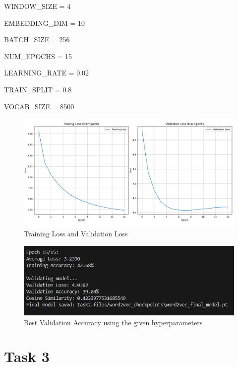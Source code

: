 \documentclass{article}
\begin{document}
\begin{description}
    \item WINDOW\_SIZE = 4
    \item EMBEDDING\_DIM = 10
    \item BATCH\_SIZE = 256
    \item NUM\_EPOCHS = 15
    \item LEARNING\_RATE = 0.02
    \item TRAIN\_SPLIT = 0.8
    \item VOCAB\_SIZE = 8500
\end{description}
\begin{figure}[H]
    \centering
    \includegraphics[width=1\linewidth]{image10.png} %
    \caption{Training Loss and Validation Loss}
    \label{fig:enter-task1}
\end{figure}
\begin{figure}[H]
    \centering
    \includegraphics[width=0.75\linewidth]{image11.png} %
    \caption{Best Validation Accuracy using the given hyperparameters}
    \label{fig:enter-task1}
\end{figure}

\section{Task 3}
\end{document}
